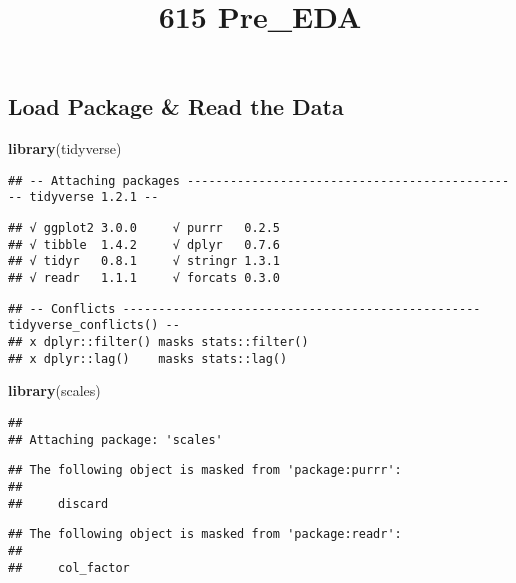 \documentclass[]{article}
\title{615 Pre\_EDA}
\author{}
\date{}
\newenvironment{Shaded}{\begin{snugshade}}{\end{snugshade}}
\newcommand{\KeywordTok}[1]{\textcolor[rgb]{0.13,0.29,0.53}{\textbf{#1}}}
\newcommand{\NormalTok}[1]{#1}
\begin{document}
\maketitle

\subsection{Load Package \& Read the
Data}\label{load-package-read-the-data}

\begin{Shaded}
\begin{Highlighting}[]
\KeywordTok{library}\NormalTok{(tidyverse)}
\end{Highlighting}
\end{Shaded}

\begin{verbatim}
## -- Attaching packages ----------------------------------------------- tidyverse 1.2.1 --
\end{verbatim}

\begin{verbatim}
## √ ggplot2 3.0.0     √ purrr   0.2.5
## √ tibble  1.4.2     √ dplyr   0.7.6
## √ tidyr   0.8.1     √ stringr 1.3.1
## √ readr   1.1.1     √ forcats 0.3.0
\end{verbatim}

\begin{verbatim}
## -- Conflicts -------------------------------------------------- tidyverse_conflicts() --
## x dplyr::filter() masks stats::filter()
## x dplyr::lag()    masks stats::lag()
\end{verbatim}

\begin{Shaded}
\begin{Highlighting}[]
\KeywordTok{library}\NormalTok{(scales) }
\end{Highlighting}
\end{Shaded}

\begin{verbatim}
## 
## Attaching package: 'scales'
\end{verbatim}

\begin{verbatim}
## The following object is masked from 'package:purrr':
## 
##     discard
\end{verbatim}

\begin{verbatim}
## The following object is masked from 'package:readr':
## 
##     col_factor
\end{verbatim}
\end{document}

